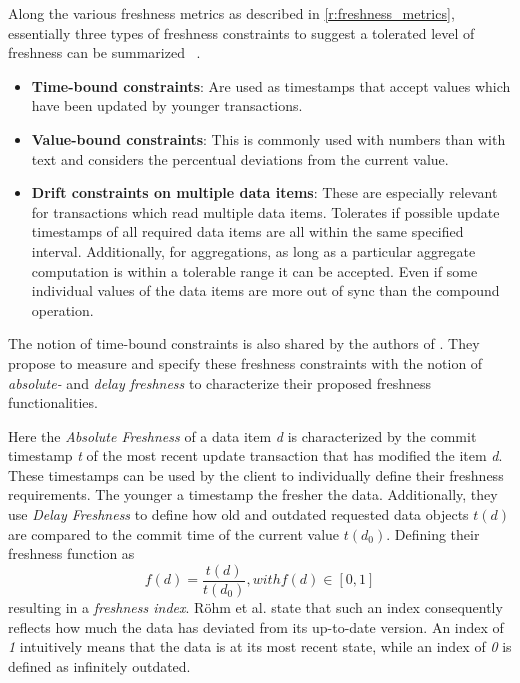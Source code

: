 Along the various freshness metrics as described in \ref{r:freshness_metrics}, essentially three types of freshness constraints
to suggest a tolerated level of freshness can be summarized ~\cite{tamer:2005, hennemann_sw_2021}.
\begin{itemize}
    \item \textbf{Time-bound constraints}: Are used as timestamps that accept values which have been updated by younger transactions. 

    \item \textbf{Value-bound constraints}: This is commonly used with numbers than with text and considers the percentual deviations from the current value.

    \item \textbf{Drift constraints on multiple data items}: These are especially relevant for transactions which read multiple data items. Tolerates if possible 
    update timestamps of all required data items are all within the same specified interval. Additionally, for aggregations, as long as a particular aggregate computation 
    is within a tolerable range it can be accepted. Even if some individual values of the data items are more out of sync than the compound operation.
\end{itemize}

The notion of time-bound constraints is also shared by the authors of \cite{voicu:2010}. They propose to measure and specify these freshness constraints 
with the notion of \emph{absolute-} and \emph{delay freshness} to characterize their proposed freshness functionalities.

Here the \textit{Absolute Freshness} of a data item \textit{d} is characterized by the commit timestamp \textit{t} 
of the most recent update transaction that has modified the item \textit{d}.
These timestamps can be used by the client to individually define their freshness requirements. The younger a timestamp the fresher the data.
Additionally, they use \textit{Delay Freshness} to define how old and outdated requested data objects $t(d)$ are compared to the commit time of the current value $t(d_0)$.
Defining their freshness function as 
\begin{equation}
    f(d) = \frac{t(d)}{t(d_0)},  with f(d) \in [0,1]
\end{equation} 
resulting in a \emph{freshness index}.
Röhm et al. \cite{rohm:2002} state that such an index consequently reflects how much the data has deviated from its up-to-date version.
An index of \emph{1} intuitively means that the data is at its most recent state, while an index of \emph{0} is defined as infinitely outdated.

